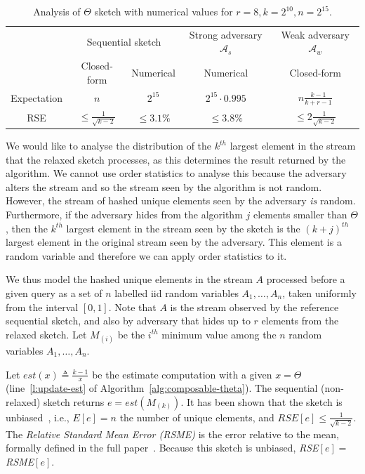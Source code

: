 \begin{table}[!ht]
    \begin{tabular}{c|cc|cc|cc}
        & \multicolumn{2}{c|}{Sequential sketch} & \multicolumn{2}{c|}{Strong adversary ${\mathcal{A}}_s$} & \multicolumn{2}{c}{Weak adversary ${\mathcal{A}}_w$}   \\%
        & Closed-form& Numerical& \multicolumn{2}{c|}{Numerical} & \multicolumn{2}{c}{Closed-form}   \\%
        \hline
        Expectation & $n$        & $2^{15}$        & \multicolumn{2}{c|}{$2^{15} \cdot 0.995$}          & \multicolumn{2}{c}{$n\frac{k-1}{k+r-1}$} \\%
        RSE & $\leq \frac{1}{\sqrt{k-2}}$        & $\leq 3.1\%$        & \multicolumn{2}{c|}{$\leq 3.8\%$}           & \multicolumn{2}{c}{$\leq 2\frac{1}{\sqrt{k-2}}$}         
    \end{tabular}
    \caption{Analysis of $\Theta$ sketch with numerical values for $r=8, k=2^{10}, n=2^{15}$.}
    \label{table:Theta-Error-Summary}
\end{table}

We would like to analyse the distribution of the $k^{th}$ largest element in the 
stream that the relaxed sketch processes, as this determines the result returned by the algorithm. 
We cannot use order statistics to analyse this 
because the adversary alters the stream and so the stream seen by the algorithm is not random.
However, the stream of hashed unique elements seen by the adversary \emph{is} random. 
Furthermore, if the adversary hides from the algorithm $j$ elements 
smaller than $\Theta$, then the $k^{th}$ largest element in the stream seen
by the  sketch is the $(k+j)^{th}$ largest element in the original stream seen by the adversary. 
This element is a random variable and therefore we can apply order statistics to it.  

We thus model the hashed unique elements in the stream $A$ processed before a given
query as a set of $n$ labelled iid random variables $A_1,\dots,A_n$, taken uniformly 
from the interval $[0,1]$. Note that
$A$ is the stream observed by the reference sequential sketch, and 
also by adversary that hides up to $r$ elements from the relaxed sketch. 
Let $M_{(i)}$ be the $i^{th}$ minimum value among the $n$ random variables $A_1,\dots,A_n$.

Let $est(x) \triangleq \frac{k-1}{x}$ be the estimate computation
with a given $x=\Theta$ (line~\ref{l:update-est} of Algorithm~\ref{alg:composable-theta}).
The sequential (non-relaxed) sketch returns $e=est(M_{(k)})$.
It has been shown that the sketch is unbiased~\cite{KMV}, i.e., $E[e]=n$ the number of unique elements,
and $RSE[e]\leq \frac{1}{\sqrt{k-2}}$.
The \emph{Relative Standard Mean Error (RSME)} is the error relative to the mean, formally defined in
the full paper~\cite{rinberg2019fast}.
Because this sketch is unbiased, \emph{RSE}$[e]=$\emph{RSME}$[e]$.


